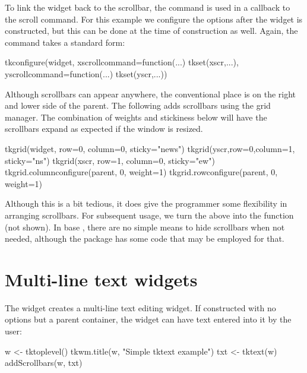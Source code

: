 To link the widget back to the scrollbar, the  command is
used in a callback to the scroll command.  For this example we
configure the options after the widget is constructed, but this can be
done at the time of construction as well. Again, the command takes a
standard form:
\begin{Schunk}
\begin{Sinput}
 tkconfigure(widget,
             xscrollcommand=function(...) tkset(xscr,...),
             yscrollcommand=function(...) tkset(yscr,...))
\end{Sinput}
\end{Schunk}

Although scrollbars can appear anywhere, the conventional place is on
the right and lower side of the parent. The following adds scrollbars
using the grid manager. The combination of weights and stickiness below
will have the scrollbars expand as expected if the window is resized.
\begin{Schunk}
\begin{Sinput}
 tkgrid(widget, row=0, column=0, sticky="news")
 tkgrid(yscr,row=0,column=1, sticky="ns")
 tkgrid(xscr, row=1, column=0, sticky="ew")
 tkgrid.columnconfigure(parent, 0, weight=1)
 tkgrid.rowconfigure(parent, 0, weight=1)
\end{Sinput}
\end{Schunk}
%
Although this is a bit tedious, it does give the programmer some
flexibility in arranging scrollbars. For subsequent usage, we turn the above into the
function  (not shown). In
base \Tk, there are no simple means to hide scrollbars when not
needed, although the  package has some code that may be
employed for that.


\section{Multi-line text widgets}
\label{sec:tcltk:multi-line-text}

The  widget creates a multi-line text editing
widget. If constructed with no options but a parent container, the
widget can have text entered into it by the user:

\begin{Schunk}
\begin{Sinput}
 w <- tktoplevel()
 tkwm.title(w, "Simple tktext example")
 txt <- tktext(w)
 addScrollbars(w, txt)
\end{Sinput}
\end{Schunk}
%

